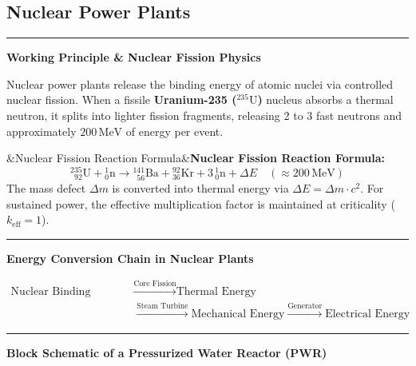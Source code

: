 \documentclass[11pt,a4paper]{article}
\newcommand{\concept}[1]{%
  \vspace{3pt}\noindent\textcolor{AnthGreen}{\rule{3.5pt}{10pt}}\enspace
  \textbf{\sffamily\color{AnthDark}#1}\par\vspace{2pt}%
}
\newenvironment{Def}[1][]{\begin{tcolorbox}[defbox]\ifx&#1&\else\textbf{\color{AnthOrange}#1:}\enspace\fi}{\end{tcolorbox}}
\begin{document}
\subsection{Nuclear Power Plants}

\concept{Working Principle \& Nuclear Fission Physics}
Nuclear power plants release the binding energy of atomic nuclei via controlled nuclear fission. When a fissile \textbf{Uranium-235 ($^{235}\text{U}$)} nucleus absorbs a thermal neutron, it splits into lighter fission fragments, releasing 2 to 3 fast neutrons and approximately $200\,\text{MeV}$ of energy per event.

\begin{Def}[Nuclear Fission Reaction Formula]
\begin{equation}
  {}^{235}_{\phantom{0}92}\text{U} + {}^1_0\text{n} \longrightarrow {}^{141}_{\phantom{0}56}\text{Ba} + {}^{92}_{36}\text{Kr} + 3\,{}^1_0\text{n} + \Delta E \quad (\approx 200\,\text{MeV})
\end{equation}
The mass defect $\Delta m$ is converted into thermal energy via $\Delta E = \Delta m \cdot c^2$. For sustained power, the effective multiplication factor is maintained at criticality ($k_{\text{eff}} = 1$).
\end{Def}

\concept{Energy Conversion Chain in Nuclear Plants}
\begin{align*}
  \text{Nuclear Binding Energy} &\xrightarrow{\text{Core Fission}} \text{Thermal Energy} \\
  &\xrightarrow{\text{Steam Turbine}} \text{Mechanical Energy} \xrightarrow{\text{Generator}} \text{Electrical Energy}
\end{align*}

\concept{Block Schematic of a Pressurized Water Reactor (PWR)}
\end{document}
